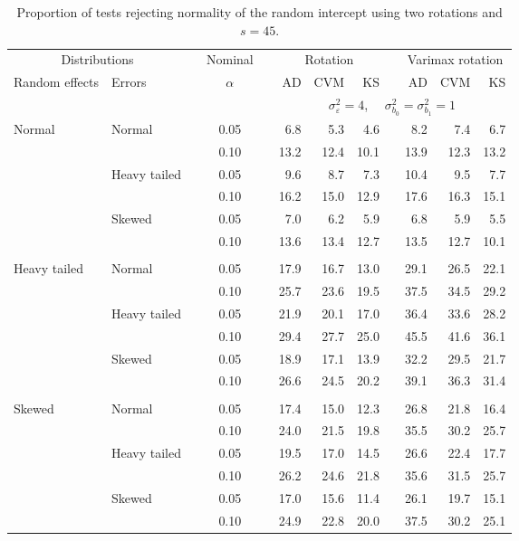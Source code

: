 \begin{table}[ht]
\centering
\caption{\label{tab:fixedsimb045} Proportion of tests rejecting normality of the random intercept using two rotations and $s = 45$.}
\begin{scriptsize}
\begin{tabular}{ll p{.1cm} c p{.1cm} rrr p{.1cm} rrr}
  \hline
  \multicolumn{2}{c}{Distributions}& & Nominal & &  \multicolumn{3}{c}{Rotation} & & \multicolumn{3}{c}{Varimax rotation} \\ \cline{1-2} \cline{6-8} \cline{10-12}   
  Random effects & Errors & & $\alpha$ & & AD & CVM & KS & & AD & CVM & KS \\ 
   \hline
& && && \multicolumn{7}{c}{$\sigma_{\varepsilon}^2 = 4$, \ \ $\sigma_{b_0}^2 = \sigma_{b_1}^2 = 1$} \\ \cline{6-12}
\rowcolor{gray!20} Normal & Normal &  & 0.05 &  & 6.8 & 5.3 & 4.6 &  & 8.2 & 7.4 & 6.7 \\ 
\rowcolor{gray!20}    &  &  & 0.10 &  & 13.2 & 12.4 & 10.1 &  & 13.9 & 12.3 & 13.2 \\ 
\rowcolor{gray!20}    & Heavy tailed &  & 0.05 &  & 9.6 & 8.7 & 7.3 &  & 10.4 & 9.5 & 7.7 \\ 
\rowcolor{gray!20}    &  &  & 0.10 &  & 16.2 & 15.0 & 12.9 &  & 17.6 & 16.3 & 15.1 \\ 
\rowcolor{gray!20}    & Skewed &  & 0.05 &  & 7.0 & 6.2 & 5.9 &  & 6.8 & 5.9 & 5.5 \\ 
\rowcolor{gray!20}    &  &  & 0.10 &  & 13.6 & 13.4 & 12.7 &  & 13.5 & 12.7 & 10.1 \\ 
&&&&&&&&&&&\\
  Heavy tailed & Normal &  & 0.05 &  & 17.9 & 16.7 & 13.0 &  & 29.1 & 26.5 & 22.1 \\ 
  &  &  & 0.10 &  & 25.7 & 23.6 & 19.5 &  & 37.5 & 34.5 & 29.2 \\ 
  & Heavy tailed &  & 0.05 &  & 21.9 & 20.1 & 17.0 &  & 36.4 & 33.6 & 28.2 \\ 
  &  &  & 0.10 &  & 29.4 & 27.7 & 25.0 &  & 45.5 & 41.6 & 36.1 \\ 
  & Skewed &  & 0.05 &  & 18.9 & 17.1 & 13.9 &  & 32.2 & 29.5 & 21.7 \\ 
  &  &  & 0.10 &  & 26.6 & 24.5 & 20.2 &  & 39.1 & 36.3 & 31.4 \\ 
&&&&&&&&&&&\\
  Skewed & Normal &  & 0.05 &  & 17.4 & 15.0 & 12.3 &  & 26.8 & 21.8 & 16.4 \\ 
  &  &  & 0.10 &  & 24.0 & 21.5 & 19.8 &  & 35.5 & 30.2 & 25.7 \\ 
  & Heavy tailed &  & 0.05 &  & 19.5 & 17.0 & 14.5 &  & 26.6 & 22.4 & 17.7 \\ 
  &  &  & 0.10 &  & 26.2 & 24.6 & 21.8 &  & 35.6 & 31.5 & 25.7 \\ 
  & Skewed &  & 0.05 &  & 17.0 & 15.6 & 11.4 &  & 26.1 & 19.7 & 15.1 \\ 
  &  &  & 0.10 &  & 24.9 & 22.8 & 20.0 &  & 37.5 & 30.2 & 25.1 \\ 




\end{tabular}
\end{scriptsize}
\end{table}
